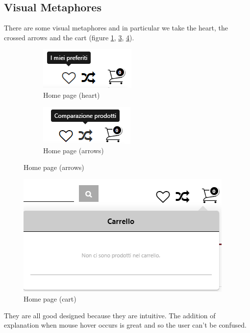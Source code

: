 \subsection{Visual Metaphores}
There are some visual metaphores and in particular we take the heart,
the crossed arrows and the cart (figure \ref{home-page-heart},
\ref{home-page-arrows}, \ref{home-page-cart}).
\begin{figure}[!h]
    \begin{subfigure}{.5\textwidth}
            \centering
            \includegraphics[scale = 0.8]{images/heart.png} 
            \caption{Home page (heart)}
            \label{home-page-heart}
    \end{subfigure}
    \begin{subfigure}{.5\textwidth}
            \centering
            \includegraphics[scale = 0.8]{images/cross-arrows.png} 
            \caption{Home page (arrows)}
            \label{home-page-arrows}
    \end{subfigure}
\end{figure}
\begin{figure}[!h] 
    \centering 
    \includegraphics[scale = 0.8]{images/cart.png} 
    \caption{Home page (cart)}
    \label{home-page-cart}
\end{figure}
\newline
They are all good designed because they are intuitive. The addition of explanation
when mouse hover occurs is great and so the user can't be confused.

